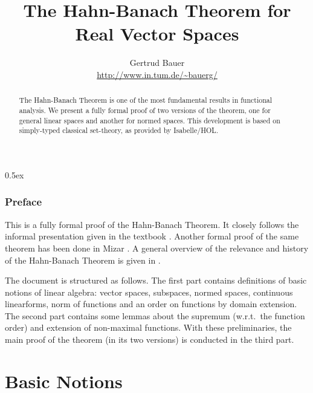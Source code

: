 \documentclass[11pt,a4paper,twoside]{article}
\begin{document}
\pagestyle{headings}

\title{The Hahn-Banach Theorem for Real Vector Spaces}

\author{Gertrud Bauer \\ \url{http://www.in.tum.de/~bauerg/}}
\maketitle
\maketitle

\begin{abstract}
  The Hahn-Banach Theorem is one of the most fundamental results in functional
  analysis. We present a fully formal proof of two versions of the theorem,
  one for general linear spaces and another for normed spaces.  This
  development is based on simply-typed classical set-theory, as provided by
  Isabelle/HOL.
\end{abstract}


\tableofcontents
\parindent 0pt \parskip 0.5ex

\clearpage
\section{Preface}

This is a fully formal proof of the Hahn-Banach Theorem. It closely follows
the informal presentation given in the textbook \cite[\S 36]{Heuser:1986}.
Another formal proof of the same theorem has been done in Mizar
\cite{Nowak:1993}.  A general overview of the relevance and history of the
Hahn-Banach Theorem is given in \cite{Narici:1996}.

\medskip The document is structured as follows.  The first part contains
definitions of basic notions of linear algebra: vector spaces, subspaces,
normed spaces, continuous linearforms, norm of functions and an order on
functions by domain extension.  The second part contains some lemmas about the
supremum (w.r.t.\ the function order) and extension of non-maximal functions.
With these preliminaries, the main proof of the theorem (in its two versions)
is conducted in the third part.


\clearpage
\part {Basic Notions}
\end{document}
